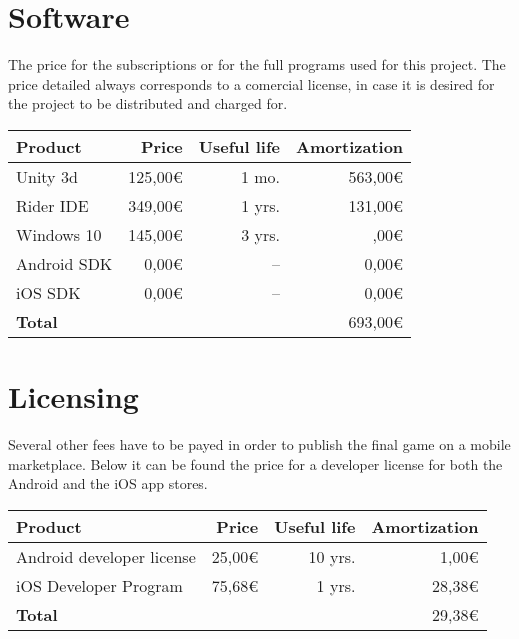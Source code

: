 \section{Software}

The price for the subscriptions or for the full programs used for this project. The price detailed always corresponds to a comercial license, in case it is desired for the project to be distributed and charged for.

\begin{center}
    \begin{tabular}{ | l | r | r | r | }
        \hline
        \textbf{Product} & \textbf{Price} &
        \textbf{Useful life} & \textbf{Amortization} \\ 
        \hline
        \hline
        Unity 3d & 125,00€ & 1 mo. & 563,00€ \\  
        Rider IDE & 349,00€ & 1 yrs. & 131,00€ \\
        Windows 10 & 145,00€ & 3 yrs. & \footnotemark
        0,00€\\ 
        Android SDK & 0,00€ & -- & 0,00€ \\ 
        iOS SDK & 0,00€ & -- & 0,00€ \\ 
        \hline
        \textbf{Total} & & & 693,00€ \\      
        \hline
    \end{tabular}
\end{center}

\section{Licensing}

Several other fees have to be payed in order to publish the final game on a mobile marketplace. Below it can be found the price for a developer license for both the Android and the iOS app stores.

\begin{center}
    \begin{tabular}{ | l | r | r | r | }
        \hline
        \textbf{Product} & \textbf{Price} &
        \textbf{Useful life} & \textbf{Amortization} \\ 
        \hline
        \hline
        Android developer license & 25,00€ & 10 yrs. & 1,00€ \\  
        iOS Developer Program & 75,68€ & 1 yrs. & 28,38€ \\
        \hline
        \textbf{Total} & & & 29,38€ \\      
        \hline
    \end{tabular}
\end{center}

